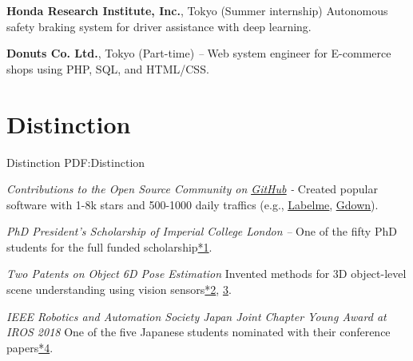 \documentclass[letterpaper,MMMyyyy,nonstop]{simpleresumecv}
\begin{document}
\begin{body}
\textbf{Honda Research Institute, Inc.}, Tokyo (Summer internship)
\hfill
\textit{}
\newline
Autonomous safety braking system for driver assistance with deep learning.

\textbf{Donuts Co. Ltd.}, Tokyo (Part-time)
\hfill
\textit{ -- }
\newline
Web system engineer for E-commerce shops using PHP, SQL, and HTML/CSS.



\section
{Distinction}
{Distinction}
{PDF:Distinction}

\textit{Contributions to the Open Source Community on \href{https://github.com/wkentaro}{\underline{GitHub}}}
\hfill
{\it {} - }
\newline
Created popular software with 1-8k stars and 500-1000 daily traffics (e.g., \href{https://github.com/wkentaro/labelme}{\underline{Labelme}}, \href{https://github.com/wkentaro/gdown}{\underline{Gdown}}).

\BigGapNoBreak

\textit{PhD President's Scholarship of Imperial College London}
\hfill
{\it {} -- }
\newline
One of the fifty PhD students for the full funded scholarship\href{https://www.imperial.ac.uk/study/pg/fees-and-funding/scholarships/presidents-phd-scholarships/}{*1}.

\BigGapNoBreak

\textit{Two Patents on Object 6D Pose Estimation}
\hfill
{\it {}}
\newline
Invented methods for 3D object-level scene understanding using vision sensors\href{https://patents.google.com/patent/WO2021198666A1/}{*2}, \href{https://patents.google.com/patent/WO2021198665A1/en}{3}.

\BigGapNoBreak

\textit{IEEE Robotics and Automation Society Japan Joint Chapter Young Award at IROS 2018}
\hfill
{\it {}}
\newline
One of the five Japanese students nominated with their conference papers\href{https://www.ieee-jp.org/section/tokyo/chapter/RA-24/RASJPYoungAward_ICRA2018.html}{*4}.


\end{body}
\end{document}
